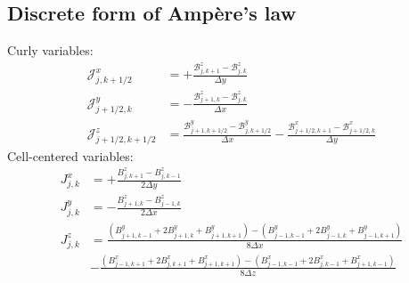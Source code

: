 \documentclass{article}
\begin{document}

\subsection{Discrete form of Amp\`ere's law}

Curly variables:
\begin{align}
  \mathcal{J}^x_{j,k+1/2} &=
  +\frac{\mathcal{B}^z_{j,k+1} - \mathcal{B}^z_{j,k}}{\Delta y} \\
  \mathcal{J}^y_{j+1/2,k} &=
  -\frac{\mathcal{B}^z_{j+1,k} - \mathcal{B}^z_{j,k}}{\Delta x} \\
  \mathcal{J}^z_{j+1/2,k+1/2} &=
  \frac{\mathcal{B}^y_{j+1,k+1/2} - \mathcal{B}^y_{j,k+1/2}}{\Delta x} -
  \frac{\mathcal{B}^x_{j+1/2,k+1} - \mathcal{B}^x_{j+1/2,k}}{\Delta y}
\end{align}
Cell-centered variables:
\begin{align}
  J^x_{j,k} &= +\frac{B^z_{j,k+1} - B^z_{j,k-1}}{2\Delta y} \\
  J^y_{j,k} &= -\frac{B^z_{j+1,k} - B^z_{j-1,k}}{2\Delta x} \\
  J^z_{j,k} &=
  \frac{(B^y_{j+1,k-1} + 2 B^y_{j+1,k} + B^y_{j+1,k+1})
      - (B^y_{j-1,k-1} + 2 B^y_{j-1,k} + B^y_{j-1,k+1})}{8\Delta x}
      \nonumber\\ &-
  \frac{(B^x_{j-1,k+1} + 2 B^x_{j,k+1} + B^x_{j+1,k+1})
      - (B^x_{j-1,k-1} + 2 B^x_{j,k-1} + B^x_{j+1,k-1})}{8\Delta z}
\end{align}
\end{document}
